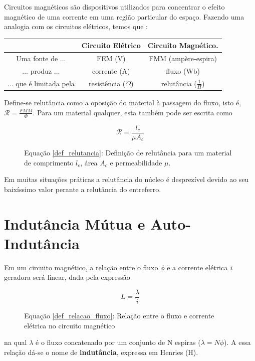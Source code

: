 \documentclass[]{report}
\begin{document}
Circuitos magnéticos são dispositivos utilizados para concentrar o efeito magnético de uma corrente em uma região particular do espaço. Fazendo uma analogia com os circuitos elétricos, temos que \cite{wentworth}: \newline

\begin{tabular}{|c|c|c|}
\hline  & Circuito Elétrico & Circuito Magnético. \\ 
\hline Uma fonte de ... & FEM (V) & FMM  (ampère-espira) \\ 
\hline ... produz ... & corrente (A) & fluxo (Wb) \\ 
\hline ... que é limitada pela & resistência ($\Omega$) & relutância ($\frac{1}{H}$)\\ 
\hline 
\end{tabular} 

Define-se relutância como a oposição do material à passagem do fluxo, isto é, $\mathcal{R} = \frac{FMM}{\Phi}$. Para um material qualquer, esta também pode ser escrita como

\begin{figure}[!ht]
\begin{equation}
\label{def_relutancia}
\mathcal{R} = \frac{l_c}{\mu A_c}
\end{equation}
\caption*{Equação \ref{def_relutancia}: Definição de relutância para um material de comprimento $l_c$, área $A_c$ e permeabilidade $\mu$.}
\end{figure}

Em muitas situações práticas a relutância do núcleo é desprezível devido ao seu baixíssimo valor perante a relutância do entreferro.

\chapter{Indutância Mútua e Auto-Indutância}

Em um circuito magnético, a relação entre o fluxo $\phi$ e a corrente elétrica \textit{i} geradora será linear, dada pela expressão
\begin{figure}[!ht]
\begin{equation}
\label{def_relacao_fluxo}
L = \frac{\lambda}{i}
\end{equation}
\caption*{Equação \ref{def_relacao_fluxo}: Relação entre o fluxo e corrente elétrica no circuito magnético}
\end{figure}

na qual $\lambda$ é o fluxo concatenado por um conjunto de N espiras ($\lambda = N \phi$). A essa relação dá-se o nome de \textbf{indutância}, expressa em Henries (H).
\end{document}
